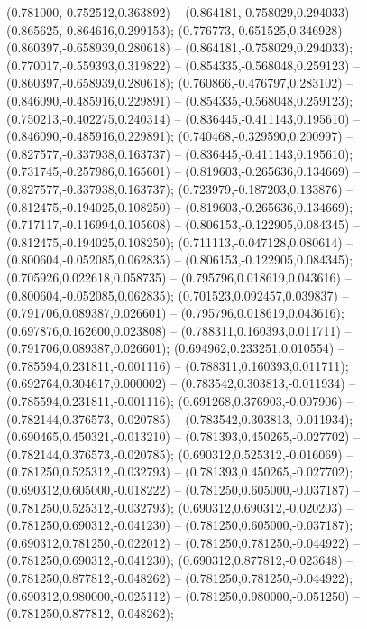  (0.781000,-0.752512,0.363892) -- (0.864181,-0.758029,0.294033) -- (0.865625,-0.864616,0.299153);
 (0.776773,-0.651525,0.346928) -- (0.860397,-0.658939,0.280618) -- (0.864181,-0.758029,0.294033);
 (0.770017,-0.559393,0.319822) -- (0.854335,-0.568048,0.259123) -- (0.860397,-0.658939,0.280618);
 (0.760866,-0.476797,0.283102) -- (0.846090,-0.485916,0.229891) -- (0.854335,-0.568048,0.259123);
 (0.750213,-0.402275,0.240314) -- (0.836445,-0.411143,0.195610) -- (0.846090,-0.485916,0.229891);
 (0.740468,-0.329590,0.200997) -- (0.827577,-0.337938,0.163737) -- (0.836445,-0.411143,0.195610);
 (0.731745,-0.257986,0.165601) -- (0.819603,-0.265636,0.134669) -- (0.827577,-0.337938,0.163737);
 (0.723979,-0.187203,0.133876) -- (0.812475,-0.194025,0.108250) -- (0.819603,-0.265636,0.134669);
 (0.717117,-0.116994,0.105608) -- (0.806153,-0.122905,0.084345) -- (0.812475,-0.194025,0.108250);
 (0.711113,-0.047128,0.080614) -- (0.800604,-0.052085,0.062835) -- (0.806153,-0.122905,0.084345);
 (0.705926,0.022618,0.058735) -- (0.795796,0.018619,0.043616) -- (0.800604,-0.052085,0.062835);
 (0.701523,0.092457,0.039837) -- (0.791706,0.089387,0.026601) -- (0.795796,0.018619,0.043616);
 (0.697876,0.162600,0.023808) -- (0.788311,0.160393,0.011711) -- (0.791706,0.089387,0.026601);
 (0.694962,0.233251,0.010554) -- (0.785594,0.231811,-0.001116) -- (0.788311,0.160393,0.011711);
 (0.692764,0.304617,0.000002) -- (0.783542,0.303813,-0.011934) -- (0.785594,0.231811,-0.001116);
 (0.691268,0.376903,-0.007906) -- (0.782144,0.376573,-0.020785) -- (0.783542,0.303813,-0.011934);
 (0.690465,0.450321,-0.013210) -- (0.781393,0.450265,-0.027702) -- (0.782144,0.376573,-0.020785);
 (0.690312,0.525312,-0.016069) -- (0.781250,0.525312,-0.032793) -- (0.781393,0.450265,-0.027702);
 (0.690312,0.605000,-0.018222) -- (0.781250,0.605000,-0.037187) -- (0.781250,0.525312,-0.032793);
 (0.690312,0.690312,-0.020203) -- (0.781250,0.690312,-0.041230) -- (0.781250,0.605000,-0.037187);
 (0.690312,0.781250,-0.022012) -- (0.781250,0.781250,-0.044922) -- (0.781250,0.690312,-0.041230);
 (0.690312,0.877812,-0.023648) -- (0.781250,0.877812,-0.048262) -- (0.781250,0.781250,-0.044922);
 (0.690312,0.980000,-0.025112) -- (0.781250,0.980000,-0.051250) -- (0.781250,0.877812,-0.048262);
